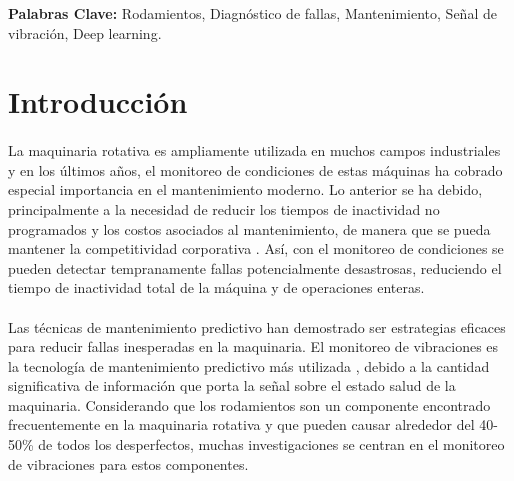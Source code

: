 \documentclass[12pt]{article}%
\begin{document}
\noindent
\textbf{Palabras Clave:} Rodamientos, Diagnóstico de fallas, Mantenimiento, Señal de vibración, Deep learning.


\newpage
\renewcommand{\contentsname}{Índice}
\renewcommand{\tablename}{Tabla} 
\tableofcontents
\renewcommand{\figurename}{Figura}
\renewcommand{\refname}{Referencias}
\renewcommand{\listtablename}{Lista de Tablas}
\newpage



\renewcommand{\listfigurename}{Lista de Figuras}
\listoffigures
\listoftables
\newpage


\section{Introducción}

\paragraph{}
La maquinaria rotativa es ampliamente utilizada en muchos campos industriales y en los últimos años, el monitoreo de condiciones de estas máquinas ha cobrado especial importancia en el mantenimiento moderno. Lo anterior se ha debido, principalmente a la necesidad de reducir los tiempos de inactividad no programados y los costos asociados al mantenimiento, de manera que se pueda mantener la competitividad corporativa \cite{seeraa}. Así, con el monitoreo de condiciones se pueden detectar tempranamente fallas potencialmente desastrosas, reduciendo el tiempo de inactividad total de la máquina y de operaciones enteras.

\paragraph{}
Las técnicas de mantenimiento predictivo han demostrado ser estrategias eficaces para reducir fallas inesperadas en la maquinaria. El monitoreo de vibraciones es la tecnología de mantenimiento predictivo más utilizada \cite{zhan}, debido a la cantidad significativa de información que porta la señal sobre el estado salud de la maquinaria. Considerando que los rodamientos son un componente encontrado frecuentemente en la maquinaria rotativa y que pueden causar alrededor del 40-50\% \cite{issam} de todos los desperfectos, muchas investigaciones se centran en el monitoreo de vibraciones para estos componentes.
\end{document}
